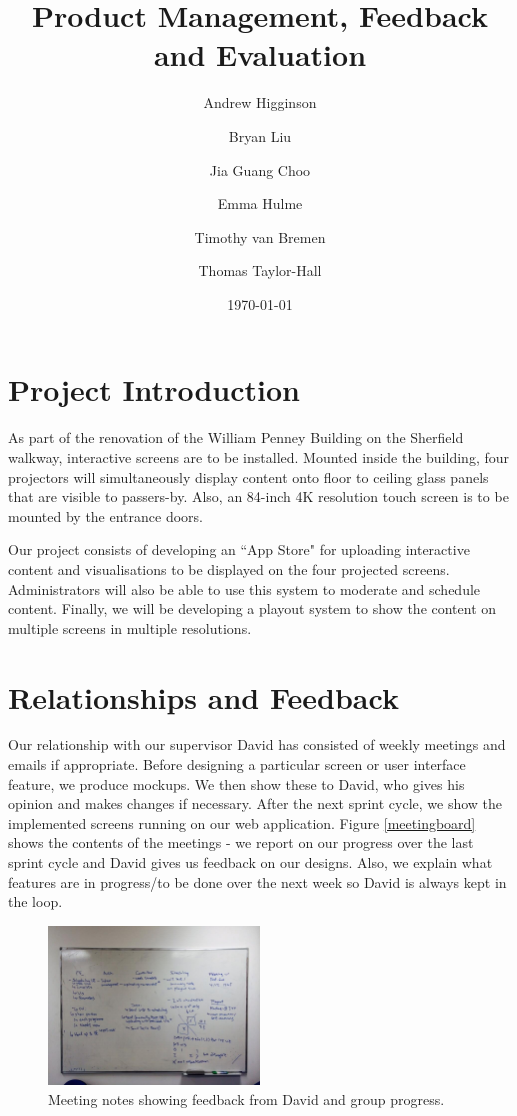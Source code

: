 \documentclass[a4paper]{article}
\begin{document}
\title{Product Management, Feedback and Evaluation}
\author{Andrew Higginson \and Bryan Liu \and Jia Guang Choo \and Emma Hulme \and 
Timothy van Bremen \and Thomas Taylor-Hall}
\date{\today}
\maketitle

\setcounter{table}{0}
\linespread{1.15}

\section{Project Introduction}
As part of the renovation of the William Penney Building on the Sherfield 
walkway, interactive screens are to be installed. Mounted inside the building,
four projectors will simultaneously display content onto floor to ceiling glass
panels that are visible to passers-by. Also, an 84-inch 4K resolution touch 
screen is to be mounted by the entrance doors. 

Our project consists of developing an ``App Store" for uploading interactive 
content and visualisations to be displayed on the four projected screens. 
Administrators will also be able to use this system to moderate and schedule 
content. Finally, we will be developing a playout system to show the content 
on multiple screens in multiple resolutions.

\section{Relationships and Feedback}
Our relationship with our supervisor David has consisted of weekly 
meetings and emails if appropriate. Before designing a particular screen
or user interface feature, we produce mockups. We then show these to 
David, who gives his opinion and makes changes if necessary. After the next 
sprint cycle, we show the implemented screens running on our web application. Figure
\ref{meetingboard} shows the contents of the meetings - we report on our progress 
over the last sprint cycle and David gives us feedback on our designs. Also, we 
explain what features are in progress/to be done over the next week so David is 
always kept in the loop.

\begin{figure}[H]
  \centering
    \includegraphics[width = 0.5\textwidth]{./evaluation/meeting-board.jpg}

  \caption{Meeting notes showing feedback from David and group progress.}
  \label{fig:meetingboard}
\end{figure}
\end{document}
